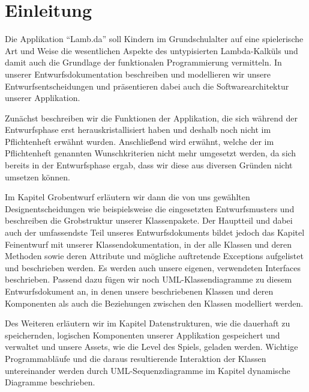 \section{Einleitung}

Die Applikation "`Lamb.da"' soll Kindern im Grundschulalter auf eine spielerische Art und Weise die wesentlichen Aspekte des untypisierten Lambda-Kalküls und damit auch die Grundlage der funktionalen Programmierung vermitteln. In unserer Entwurfsdokumentation beschreiben und modellieren wir unsere Entwurfsentscheidungen und präsentieren dabei auch die Softwarearchitektur unserer Applikation.

Zunächst beschreiben wir die Funktionen der Applikation, die sich während der Entwurfsphase erst herauskristallisiert haben und deshalb noch nicht im Pflichtenheft erwähnt wurden. Anschließend wird erwähnt, welche der im Pflichtenheft genannten Wunschkriterien nicht mehr umgesetzt werden, da sich bereits in der Entwurfsphase ergab, dass wir diese aus diversen Gründen nicht umsetzen können.

Im Kapitel Grobentwurf erläutern wir dann die von uns gewählten Designentscheidungen wie beispielsweise die eingesetzten Entwurfsmusters und beschreiben die Grobstruktur unserer Klassenpakete. Der Hauptteil und dabei auch der umfassendste Teil unseres Entwurfsdokuments bildet jedoch das Kapitel Feinentwurf mit unserer Klassendokumentation, in der alle Klassen und deren Methoden sowie deren Attribute und mögliche auftretende Exceptions aufgelistet und beschrieben werden. Es werden auch unsere eigenen, verwendeten Interfaces beschrieben. Passend dazu fügen wir noch UML-Klassendiagramme zu diesem Entwurfsdokument an, in denen unsere beschriebenen Klassen und deren Komponenten als auch die Beziehungen zwischen den Klassen modelliert werden.

Des Weiteren erläutern wir im Kapitel Datenstrukturen, wie die dauerhaft zu speichernden, logischen Komponenten unserer Applikation gespeichert und verwaltet und unsere Assets, wie die Level des Spiels, geladen werden. Wichtige Programmabläufe und die daraus resultierende Interaktion der Klassen untereinander werden durch UML-Sequenzdiagramme im Kapitel dynamische Diagramme beschrieben.